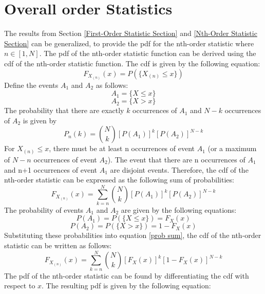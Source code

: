 \documentclass[conference]{IEEEtran}
\begin{document}
\section{Overall order Statistics}
The results from Section \ref{First-Order Statistic Section} and \ref{Nth-Order Statistic Section} can be generalized, to provide the pdf for the nth-order statistic where $n\in[1,N]$. The pdf of the nth-order statistic function can be derived using the cdf of the nth-order statistic function. The cdf is given by the following equation:
\begin{equation}
F_{X_{(n)}}(x) = P(\{X_{(n)} \leq x\})
\end{equation}
Define the events $A_1$ and $A_2$ as follows:
\begin{equation}
A_1 = \{X \leq x\}
\end{equation}
\begin{equation}
A_2 = \{X > x\}
\end{equation}
The probability that there are exactly $k$ occurrences of $A_1$ and $N-k$ occurrences of $A_2$ is given by
\begin{equation}
P_n(k) = \binom{N}{k}[P(A_1)]^k[P(A_2)]^{N-k}
\end{equation}
For $X_{(n)} \leq x$, there must be at least n occurrences of event $A_1$ (or a maximum of $N-n$ occurrences of event $A_2$). The event that there are n occurrences of $A_1$ and n+1 occurrences of event  $A_1$ are disjoint events. Therefore,  the cdf of the nth-order statistic can be expressed as the following sum of probabilities:
\begin{equation}
\label{prob sum}
F_{X_{(n)}}(x) = \sum_{k=n}^{N}\binom{N}{k}[P(A_1)]^k[P(A_2)]^{N-k}
\end{equation}
The probability of events $A_1$ and $A_2$ are given by the following equations:
\begin{equation}
P(A_1) = P(\{X \leq x\}) = F_X(x)
\end{equation}
\begin{equation}
P(A_2) = P(\{X > x\}) = 1 - F_X(x)
\end{equation}
Substituting these probabilities into equation \eqref{prob sum}, the cdf of the nth-order statistic can be written as follows:
\begin{equation}
F_{X_{(n)}}(x) = \sum_{k=n}^{N}\binom{N}{k}[F_X(x)]^k[1-F_X(x)]^{N-k}
\end{equation}
The pdf of the nth-order statistic can be found by differentiating the cdf with respect to $x$. The resulting pdf is given by the following equation:
\end{document}
